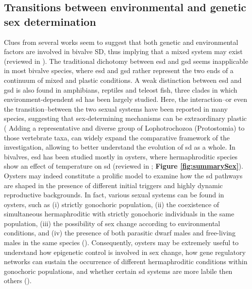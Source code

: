 \documentclass[../main.tex]{subfiles}
\begin{document}
\subsection{Transitions between environmental and genetic sex determination}
Clues from several works seem to suggest that both genetic and environmental factors are involved in bivalve SD, thus implying that a mixed system may exist (reviewed in \textbf{\cite{breton2018sex}}). The traditional dichotomy between \gls{esd} and \gls{gsd} seems inapplicable in most bivalve species, where \gls{esd} and \gls{gsd} rather represent the two ends of a continuum of mixed and plastic conditions.  A weak distinction between \gls{esd} and \gls{gsd} is also found in amphibians, reptiles and teleost fish, three clades in which environment-dependent \gls{sd} has been largely studied. Here, the interaction–or even the transition–between the two sexual systems have been reported in many species, suggesting that sex-determining mechanisms can be extraordinary plastic (\textbf{\cite{bachtrog2014sex, capel2017vertebrate}} Adding a representative and diverse group of Lophotrochozoa (Protostomia) to those vertebrate taxa, can widely expand the comparative framework of the investigation, allowing to better understand the evolution of \gls{sd} as a whole. In bivalves, \gls{esd} has been studied mostly in oysters, where hermaphroditic species show an effect of temperature on \gls{sd} (reviewed in \textbf{\cite{breton2018sex}}; \textbf{Figure \ref{fig:summarySex}}). Oysters may indeed constitute a prolific model to examine how the \gls{sd} pathways are shaped in the presence of different initial triggers and highly dynamic reproductive backgrounds. In fact, various sexual systems can be found in oysters, such as (i) strictly gonochoric population, (ii) the coexistence of simultaneous hermaphroditic with strictly gonochoric individuals in the same population, (iii) the possibility of sex change according to environmental conditions, and (iv) the presence of both parasitic dwarf males and free-living males in the same species (\textbf{\cite{collin2013phylogenetic}}). Consequently, oysters may be extremely useful to understand how epigenetic control is involved in sex change, how gene regulatory networks can sustain the occurrence of different hermaphroditic conditions within gonochoric populations, and whether certain \gls{sd} systems are more labile then others (\textbf{\cite{abbott2011intra}}).
\end{document}
